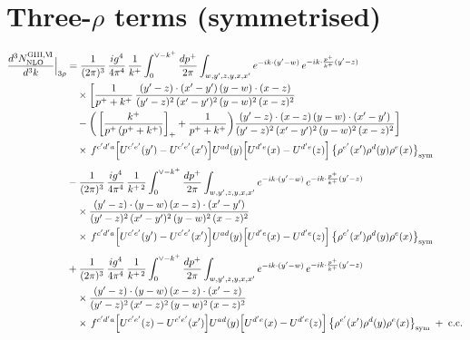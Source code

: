 \documentclass[9pt]{article}
\numberwithin{equation}{section}
\begin{document}
\section{Three-$\rho$ terms (symmetrised)}
\begin{align}
\frac{d^{3}N^{\rm GIII,V\!I}_{\rm NLO}}{d^{3}k}\Big|_{3\rho}&=\frac{1}{(2\pi)^{3}}\,\frac{ig^{4}}{4\pi^{4}}\,\frac{1}{k^{+}}\int_{0}^{\vee-k^{+}}\frac{dp^{+}}{2\pi}\int_{w,y^{\prime},z,y,x,x^{\prime}}e^{-ik\cdot(y^{\prime}-w)}\,e^{-ik\cdot\frac{p^{+}}{k^{+}}(y^{\prime}-z)}\notag\\&\quad\times\bigg[\frac{1}{p^{+}+k^{+}}\,\frac{(y^{\prime}-z)\cdot(x^{\prime}-y^{\prime})\,(y-w)\cdot(x-z)}{(y^{\prime}-z)^{2}\,(x^{\prime}-y^{\prime})^{2}\,(y-w)^{2}\,(x-z)^{2}}\notag\\
&\quad -\bigg(\left[\frac{k^{+}}{p^{+}\,(p^{+}+k^{+})}\right]_{+}+\frac{1}{p^{+}+k^{+}}\bigg)\frac{(y^{\prime}-z)\cdot(x-z)\,(y-w)\cdot(x^{\prime}-y^{\prime})}{(y^{\prime}-z)^{2}\,(x^{\prime}-y^{\prime})^{2}\,(y-w)^{2}\,(x-z)^{2}}\bigg]\notag\\&\quad\times\,f^{c^{\prime}d^{\prime}a}\Big[U^{c^{\prime}e^{\prime}}(y^{\prime})-U^{c^{\prime}e^{\prime}}(x^{\prime})\Big]U^{ad}(y)\Big[U^{d^{\prime}e}(x)-U^{d^{\prime}e}(z)\Big]\,\big\{\rho^{e^{\prime}}(x^{\prime})\rho^{d}(y)\rho^{e}(x)\big\}_{\rm sym}\notag\\[4pt]
&-\frac{1}{(2\pi)^{3}}\,\frac{ig^{4}}{4\pi^{4}}\,\frac{1}{k^{+\,2}}\int_{0}^{\vee-k^{+}}\frac{dp^{+}}{2\pi}\int_{w,y^{\prime},z,y,x,x^{\prime}}e^{-ik\cdot(y^{\prime}-w)}\,e^{-ik\cdot\frac{p^{+}}{k^{+}}(y^{\prime}-z)}\notag\\&\quad\times\frac{(y^{\prime}-z)\cdot(y-w)\,(x-z)\cdot(x^{\prime}-y^{\prime})}{(y^{\prime}-z)^{2}\,(x^{\prime}-y^{\prime})^{2}\,(y-w)^{2}\,(x-z)^{2}}\notag\\&\quad\times\,f^{c^{\prime}d^{\prime}a}\Big[U^{c^{\prime}e^{\prime}}(y^{\prime})-U^{c^{\prime}e^{\prime}}(x^{\prime})\Big]U^{ad}(y)\Big[U^{d^{\prime}e}(x)-U^{d^{\prime}e}(z)\Big]\,\big\{\rho^{e^{\prime}}(x^{\prime})\rho^{d}(y)\rho^{e}(x)\big\}_{\rm sym}\notag\\[4pt]
&+\frac{1}{(2\pi)^{3}}\,\frac{ig^{4}}{4\pi^{4}}\,\frac{1}{k^{+\,2}}\int_{0}^{\vee-k^{+}}\frac{dp^{+}}{2\pi}\int_{w,y^{\prime},z,y,x,x^{\prime}}e^{-ik\cdot(y^{\prime}-w)}\,e^{-ik\cdot\frac{p^{+}}{k^{+}}(y^{\prime}-z)}\notag\\&\quad\times\frac{(y^{\prime}-z)\cdot(y-w)\,(x-z)\cdot(x^{\prime}-z)}{(y^{\prime}-z)^{2}\,(x^{\prime}-z)^{2}\,(y-w)^{2}\,(x-z)^{2}}\notag\\&\quad\times\,f^{c^{\prime}d^{\prime}a}\Big[U^{c^{\prime}e^{\prime}}(z)-U^{c^{\prime}e^{\prime}}(x^{\prime})\Big]U^{ad}(y)\Big[U^{d^{\prime}e}(x)-U^{d^{\prime}e}(z)\Big]\,\big\{\rho^{e^{\prime}}(x^{\prime})\rho^{d}(y)\rho^{e}(x)\big\}_{\rm sym}\;+\;{\rm c.c.}
\end{align}
\end{document}
